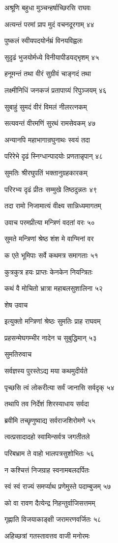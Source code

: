अश्रूणि बहुधा मुञ्चन्हर्षाच्छिरसि राघवः

अत्यन्तं परमां प्राप मुदं वचनदूरगाम् ४४

पुष्कलं स्वीयपदयोर्नम्रं विनयविह्वलः

सुदृढं भुजयोर्मध्ये विनीयापीडयद्भृशम् ४५

हनूमन्तं तथा वीरं सुग्रीवं चाङ्गदं तथा

लक्ष्मीनिधिं जनकजं प्रतापाग्र्यं रिपुञ्जयम् ४६

सुबाहुं सुमदं वीरं विमलं नीलरत्नकम्

सत्यवन्तं वीरमणिं सुरथं रामसेवकम् ४७

अन्यानपि महाभागान्रघुनाथः स्वयं तदा

परिरेभे दृढं स्निग्धान्पादयोः प्रणतान्नृपान् ४८

सुमतिः श्रीरघुपतिं भक्तानुग्रहकारकम्

परिरभ्य दृढं प्रीतः सम्मुखे तिष्ठदुन्नतः ४९

तदा रामो निजामात्यं वीक्ष्य सान्निध्यमागतम्

उवाच परमप्रीत्या मन्त्रिणं वदतां वरः ५०

सुमते मन्त्रिणां श्रेष्ठ शंश मे वाग्मिनां वर

क एते भूमिपाः सर्वे कथमत्र समागताः ५१

कुत्रकुत्र हयः प्राप्तः केनकेन नियन्त्रितः

कथं वै मोचितो भ्रात्रा महाबलसुशालिना ५२

शेष उवाच

इत्युक्तो मन्त्रिणां श्रेष्ठः सुमतिः प्राह राघवम्

प्रहसन्मेघगम्भीर नादेन च सुबुद्धिमान् ५३

सुमतिरुवाच

सर्वज्ञस्य पुरस्तेऽद्य मया कथमुदीर्यते

पृच्छसि त्वं लोकरीत्या सर्वं जानासि सर्वदृक् ५४

तथापि तव निर्देशं शिरस्याधाय सर्वदा

ब्रवीमि तच्छृणुष्वाद्य सर्वराजशिरोमणे ५५

त्वत्प्रसादादहो स्वामिन्सर्वत्र जगतीतले

परिबभ्राम ते वाहो भालपत्रसुशोभितः ५६

न कश्चित्तं निजग्राह स्वनामबलदर्पितः

स्वं स्वं राज्यं समर्प्याथ प्रणेमुस्ते पदाम्बुजम् ५७

को वा रावण दैत्येन्द्र निहन्तुर्वाजिसत्तमम्

गृह्णाति विजयाकाङ्क्षी जरामरणवर्जितः ५८

अहिच्छत्रां गतस्तावत्तव वाजी मनोरमः

